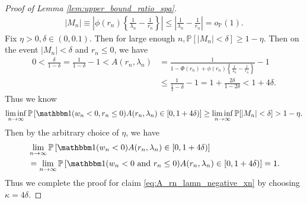 \documentclass[12pt]{article}
\theoremstyle{definition}
\def\P{\mathbb{P}}
\def\P{\mathbb{P}}
\renewcommand{\P}{\mathbb{P}}							%
\newcommand{\indicator}{\mathbbm 1}						%
\begin{document}
\begin{proof}[Proof of Lemma \ref{lem:upper_bound_ratio_spa}]
\begin{align*}
		|M_n|\equiv \left|\phi(r_n)\left\{\frac{1}{\lambda_n}-\frac{1}{r_n}\right\}\right|\leq\left|\frac{1}{\lambda_n}-\frac{1}{r_n}\right| =o_\P(1).
	\end{align*}
	Fix $\eta>0,\delta\in (0,0.1)$. Then for large enough $n,\P[|M_n|<\delta]\geq 1-\eta$. Then on the event $|M_n|<\delta$ and $r_n\leq 0$, we have 
	\begin{align}
		0<\frac{\delta}{1-\delta}
		=\frac{1}{1-\delta}-1 <A(r_n,\lambda_n)
		&\label{eq:A_r_lam_decomposition}
		=\frac{1}{1 - \Phi(r_n)+\phi(r_n)\left\{\frac{1}{\lambda_n}-\frac{1}{r_n}\right\}}-1\\
		&\nonumber
		\leq \frac{1}{\frac{1}{2}-\delta}-1=1+\frac{2\delta}{1-2\delta}<1+4\delta.
	\end{align}
	Thus we know 
	\begin{align*}
		\liminf_{n\rightarrow\infty}\P\left[\indicator(w_n<0,r_n \leq 0)A(r_n,\lambda_n)\in [0,1+4\delta)\right]\geq \liminf_{n\rightarrow\infty}\P[|M_n|<\delta]>1-\eta.
	\end{align*}
	Then by the arbitrary choice of $\eta$, we have 
	\begin{align}
		&\nonumber
		\lim_{n\rightarrow\infty}\P\left[\indicator(w_n < 0)A(r_n,\lambda_n)\in [0,1+4\delta)\right]\\
		&\label{eq:A_r_n_lam_n_convergence}
		=\lim_{n\rightarrow\infty}\P\left[\indicator(w_n<0\text{ and }r_n \leq 0)A(r_n,\lambda_n)\in [0, 1+4\delta)\right]=1.
	\end{align}
	Thus we complete the proof for claim \eqref{eq:A_rn_lamn_negative_xn} by choosing $\kappa=4\delta$.


\end{proof}
\end{document}
